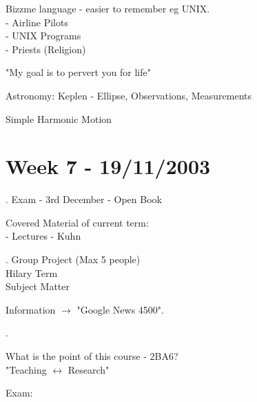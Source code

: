 \documentclass[a4paper,12pt]{article}
\begin{document}
\noindent Bizzme language - easier to remember eg UNIX. \\

\noindent - Airline Pilots \\
\noindent - UNIX Programs \\
\noindent - Priests (Religion)

\vspace{10mm}

\noindent "My goal is to pervert you for life"

\vspace{10mm}

\noindent Astronomy: Keplen - Ellipse, Observations, Measurements


\vspace{10mm}

\noindent Simple Harmonic Motion

\section{Week 7 - 19/11/2003}

. Exam - 3rd December - Open Book

\vspace{10mm}

\noindent Covered Material of current term: \\

\noindent - Lectures
\noindent - Kuhn

\vspace{10mm}

. Group Project (Max 5 people) \\
\noindent Hilary Term \\
\noindent Subject Matter

\vspace{10mm}

\noindent Information $\to$ "Google News 4500".

\vspace{10mm}

.

\noindent What is the point of this course - 2BA6? \\
\noindent "Teaching $\longleftrightarrow$ Research"

\vspace{10mm}

\noindent Exam:

\vspace{10mm}
\end{document}
